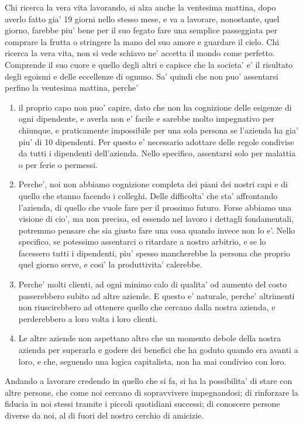 Chi ricerca la vera vita lavorando, si alza anche la ventesima mattina, dopo averlo fatto gia' 19 giorni nello stesso mese, e va a lavorare, nonostante, quel giorno, farebbe piu' bene per il suo fegato fare una semplice passeggiata per comprare la frutta o stringere la mano del suo amore e guardare il cielo. Chi ricerca la vera vita, non si vede schiavo ne' accetta il mondo come perfetto. Comprende il suo cuore e quello degli altri e capisce che la societa' e' il risultato degli egoismi e delle eccellenze di ognuno. Sa' quindi che non puo' assentarsi perfino la ventesima mattina, perche'
\begin{enumerate}
    \item il proprio capo non puo' capire, dato che non ha cognizione delle esigenze di ogni dipendente, e averla non e' facile e sarebbe molto impegnativo per chiunque, e praticamente impossibile per una sola persona se l'azienda ha gia' piu' di 10 dipendenti.
        Per questo e' necessario adottare delle regole condivise da tutti i dipendenti dell'azienda. Nello specifico, assentarsi solo per malattia o per ferie o permessi.
    \item Perche', noi non abbiamo cognizione completa dei piani dei nostri capi e di quello che stanno facendo i colleghi. Delle difficolta' che sta' affrontando l'azienda, di quello che vuole fare per il prossimo futuro.
   Forse abbiamo una visione di cio', ma non precisa, ed essendo nel lavoro i dettagli fondamentali, potremmo pensare che sia giusto fare una cosa quando invece non lo e'. Nello specifico, se potessimo assentarci o ritardare a nostro arbitrio, e se lo facessero tutti i dipendenti, piu' spesso mancherebbe la persona che proprio quel giorno serve, e cosi' la produttivita' calerebbe.
    \item Perche' molti clienti, ad ogni minimo calo di qualita' od aumento del costo passerebbero subito ad altre aziende. E questo e' naturale, perche' altrimenti non riuscirebbero ad ottenere quello che cercano dalla nostra azienda, e perderebbero a loro volta i loro clienti.
    \item Le altre aziende non aspettano altro che un momento debole della nostra azienda per superarla e godere dei benefici che ha goduto quando era avanti a loro, e che, seguendo una logica capitalista, non ha mai condiviso con loro.

\end{enumerate}
Andando a lavorare credendo in quello che si fa, si ha la possibilita' di stare con altre persone, che come noi cercano di sopravvivere impegnandosi; di rinforzare la fiducia in noi stessi tramite i piccoli quotidiani successi; di conoscere persone diverse da noi, al di fuori del nostro cerchio di amicizie.

